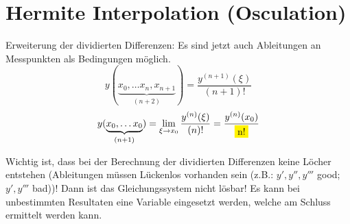 \section{Hermite Interpolation (Osculation)}
Erweiterung der dividierten Differenzen: Es sind jetzt auch Ableitungen an Messpunkten als 
Bedingungen möglich.
$$y(\underbrace{x_0, \ldots x_n, x_{n+1}}_{(n+2)}) = \frac{y^{(n+1)}(\xi)}{(n+1)!}$$
$$y(\underbrace{x_0, \ldots x_0}_{(n+1)}) = \lim_{\xi \rightarrow x_0} \frac{y^{(n)}(\xi)}{(n)!} = \frac{y^{(n)}(x_0)}{\hilight{n!}}$$

Wichtig ist, dass bei der Berechnung der dividierten Differenzen keine Löcher entstehen (Ableitungen müssen Lückenlos vorhanden sein (z.B.: $y',y'',y'''$ good; $y',y'''$ bad))! Dann ist das 
Gleichungssystem nicht lösbar! Es kann bei unbestimmten Resultaten eine Variable eingesetzt werden,
welche am Schluss ermittelt werden kann.

